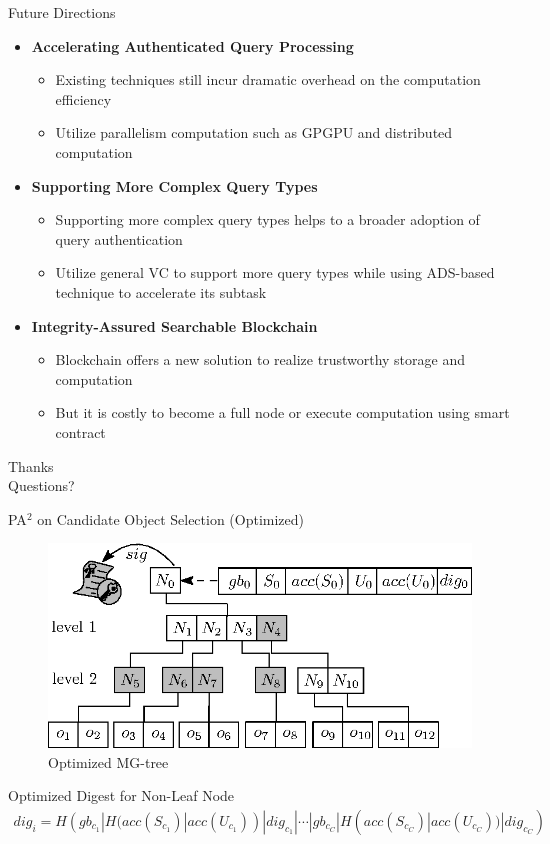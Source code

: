 \documentclass[xcolor={dvipsnames},aspectratio=169,10pt]{beamer}
\begin{document}
\begin{frame}{Future Directions}
  \begin{itemize}[<+->]
    \item \textbf{Accelerating Authenticated Query Processing}
      \begin{itemize}[<1->]
        \item Existing techniques still incur dramatic overhead on the computation efficiency
        \item Utilize parallelism computation such as GPGPU and distributed computation
      \end{itemize}
    \item \textbf{Supporting More Complex Query Types}
      \begin{itemize}[<1->]
        \item Supporting more complex query types helps to a broader adoption of query authentication
        \item Utilize general VC to support more query types while using ADS-based technique to accelerate its subtask
      \end{itemize}
    \item \textbf{Integrity-Assured Searchable Blockchain}
      \begin{itemize}[<1->]
        \item Blockchain offers a new solution to realize trustworthy storage and computation
        \item But it is costly to become a full node or execute computation using smart contract
      \end{itemize}
  \end{itemize}
\end{frame}

\begin{frame}[standout]
  Thanks \\
  Questions?
\end{frame}

\appendix%

\begin{frame}{PA$^2$ on Candidate Object Selection (Optimized)}
  \begin{figure}
    \includegraphics[width=.4\linewidth]{figs/aggregate-queries/grid_tree_opt.eps}
    \caption{Optimized MG-tree}
  \end{figure}
  \begin{alertblock}{Optimized Digest for Non-Leaf Node}
    \begin{align*}
      dig_i = H(gb_{c_1} | H(acc(S_{c_1})| acc(U_{c_1})) | dig_{c_1} | \dotsb
      |gb_{c_C} | H(acc(S_{c_C})|acc(U_{c_C})) | dig_{c_C})
    \end{align*}
  \end{alertblock}
\end{frame}
\end{document}
